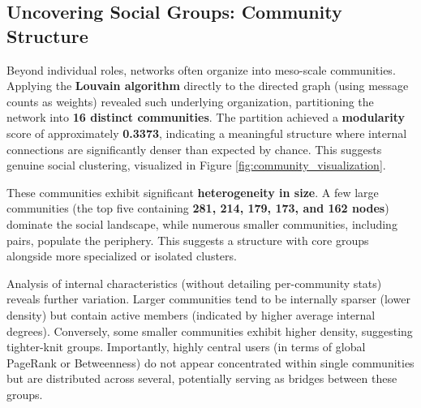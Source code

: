 \subsection{Uncovering Social Groups: Community Structure}
\label{sec:community_structure}

Beyond individual roles, networks often organize into meso-scale communities. Applying the \textbf{Louvain algorithm} directly to the directed graph (using message counts as weights) revealed such underlying organization, partitioning the network into \textbf{16 distinct communities}. The partition achieved a \textbf{modularity} score of approximately \textbf{0.3373}, indicating a meaningful structure where internal connections are significantly denser than expected by chance. This suggests genuine social clustering, visualized in Figure \ref{fig:community_visualization}.


These communities exhibit significant \textbf{heterogeneity in size}. A few large communities (the top five containing \textbf{281, 214, 179, 173, and 162 nodes}) dominate the social landscape, while numerous smaller communities, including pairs, populate the periphery. This suggests a structure with core groups alongside more specialized or isolated clusters.


Analysis of internal characteristics (without detailing per-community stats) reveals further variation. Larger communities tend to be internally sparser (lower density) but contain active members (indicated by higher average internal degrees). Conversely, some smaller communities exhibit higher density, suggesting tighter-knit groups. Importantly, highly central users (in terms of global PageRank or Betweenness) do not appear concentrated within single communities but are distributed across several, potentially serving as bridges between these groups.